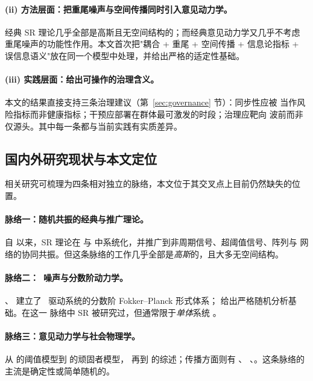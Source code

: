 \paragraph{(ii) 方法层面：把重尾噪声与空间传播同时引入意见动力学。}
经典 SR 理论几乎全部是高斯且无空间结构的；而经典意见动力学又几乎不考虑
重尾噪声的功能性作用。本文首次把"耦合 + 重尾 + 空间传播 + 信息论指标 +
误信息语义"放在同一个模型中处理，并给出严格的适定性基础。

\paragraph{(iii) 实践层面：给出可操作的治理含义。}
本文的结果直接支持三条治理建议（第~\ref{sec:governance} 节）：同步性应被
当作风险指标而非健康指标；干预应部署在群体最可激发的时段；治理应靶向
波前而非仅源头。其中每一条都与当前实践有实质差异。

\subsection{国内外研究现状与本文定位}
\label{sec:literature}
相关研究可梳理为四条相对独立的脉络，本文位于其交叉点上目前仍然缺失的位置。

\paragraph{脉络一：随机共振的经典与推广理论。}
自 \citet{benzi1981} 以来，SR 理论在 \citet{mcnamara1989} 与
\citet{gammaitoni1998} 中系统化，并推广到非周期信号、超阈值信号、阵列与
网络的协同共振。但这条脉络的工作几乎全部是\emph{高斯}的，且大多无空间结构。

\paragraph{脉络二：\Levy\ 噪声与分数阶动力学。}
\citet{jespersen1999}、\citet{chechkin2003} 建立了 \Levy\ 驱动系统的分数阶
Fokker--Planck 形式体系；\citet{applebaum2009} 给出严格随机分析基础。在这一
脉络中 SR 被研究过，但通常限于\emph{单体}系统 \citep{liu2018levy}。

\paragraph{脉络三：意见动力学与社会物理学。}
从 \citet{granovetter1978} 的阈值模型到 \citet{galam2002} 的顽固者模型，
再到 \citet{castellano2009} 的综述；传播方面则有 \citet{watts2002}、
\citet{kempe2003}、\citet{leskovec2007}。这条脉络的主流是确定性或简单随机的。

